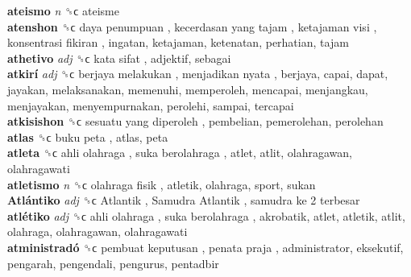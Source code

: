 \textbf{ateismo} \emph{n}  ␝ϲ  ateisme  \\
\textbf{atenshon} ␝ϲ   daya penumpuan ,  kecerdasan yang tajam ,  ketajaman visi ,  konsentrasi fikiran , ingatan, ketajaman, ketenatan, perhatian, tajam  \\
\textbf{athetivo} \emph{adj}  ␝ϲ   kata sifat , adjektif, sebagai  \\
\textbf{atkirí} \emph{adj}  ␝ϲ   berjaya melakukan ,  menjadikan nyata , berjaya, capai, dapat, jayakan, melaksanakan, memenuhi, memperoleh, mencapai, menjangkau, menjayakan, menyempurnakan, perolehi, sampai, tercapai  \\
\textbf{atkisishon} ␝ϲ   sesuatu yang diperoleh , pembelian, pemerolehan, perolehan  \\
\textbf{atlas} ␝ϲ   buku peta , atlas, peta  \\
\textbf{atleta} ␝ϲ   ahli olahraga ,  suka berolahraga , atlet, atlit, olahragawan, olahragawati  \\
\textbf{atletismo} \emph{n}  ␝ϲ   olahraga fisik , atletik, olahraga, sport, sukan  \\
\textbf{Atlántiko} \emph{adj}  ␝ϲ   Atlantik ,  Samudra Atlantik ,  samudra ke 2 terbesar   \\
\textbf{atlétiko} \emph{adj}  ␝ϲ   ahli olahraga ,  suka berolahraga , akrobatik, atlet, atletik, atlit, olahraga, olahragawan, olahragawati  \\
\textbf{atministradó} ␝ϲ   pembuat keputusan ,  penata praja , administrator, eksekutif, pengarah, pengendali, pengurus, pentadbir  \\
